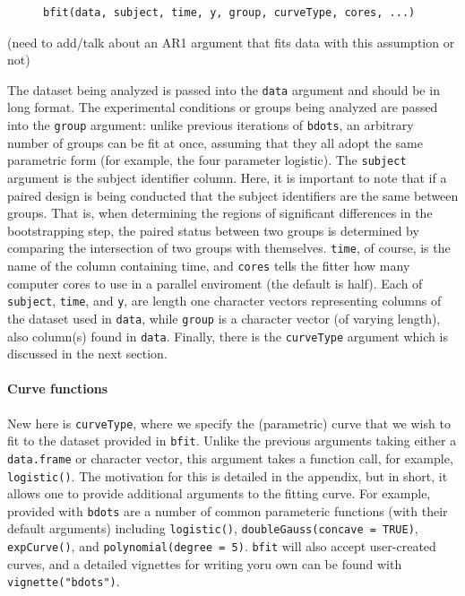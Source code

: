 \documentclass{article}
\newcommand{\xt}{\texttt}%
\begin{document}
\begin{singlespace}
\begin{figure}[h!]
\centering
\begin{BVerbatim}
bfit(data, subject, time, y, group, curveType, cores, ...)
\end{BVerbatim}
\end{figure}
\end{singlespace}

(need to add/talk about an AR1 argument that fits data with this assumption or not)

The dataset being analyzed is passed into the \xt{data} argument and should be in long format. The experimental conditions or groups being analyzed are passed into the \xt{group} argument: unlike previous iterations of \xt{bdots}, an arbitrary number of groups can be fit at once, assuming that they all adopt the same parametric form (for example, the four parameter logistic). The \xt{subject} argument is the subject identifier column. Here, it is important to note that if a paired design is being conducted that the subject identifiers are the same between groups. That is, when determining the regions of significant differences in the bootstrapping step, the paired status between two groups is determined by comparing the intersection of two groups with themselves. \xt{time}, of course, is the name of the column containing time, and \xt{cores} tells the fitter how many computer cores to use in a parallel enviroment (the default is half). Each of \xt{subject}, \xt{time}, and \xt{y}, are length one character vectors representing columns of the dataset used in \xt{data}, while \xt{group} is a character vector (of varying length), also column(s) found in \xt{data}. Finally, there is the \xt{curveType} argument which is discussed in the next section.

\paragraph{Curve functions} New here is \xt{curveType}, where we specify the (parametric) curve that we wish to  fit to the dataset provided in \xt{bfit}. Unlike the previous arguments taking either a \xt{data.frame} or character vector, this argument takes a function call, for example, \xt{logistic()}. The motivation for this is detailed in the appendix, but in short, it allows one to provide additional arguments to the fitting curve. For example, provided with \xt{bdots} are a number of common parameteric functions (with their default arguments) including \xt{logistic()}, \xt{doubleGauss(concave = TRUE)}, \xt{expCurve()}, and \xt{polynomial(degree = 5)}. \xt{bfit} will also accept user-created curves, and a detailed vignettes for writing yoru own can be found with \xt{vignette("bdots")}.
\end{document}
